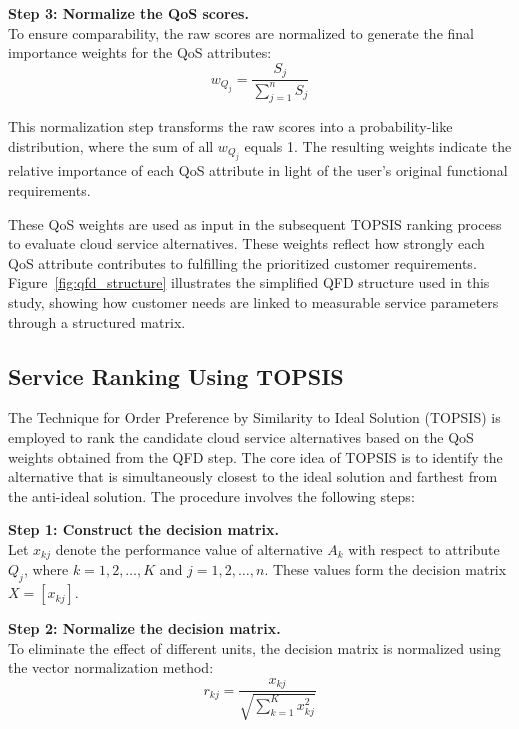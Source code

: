 \documentclass[twocolumn]{svjour3}
\begin{document}
\textbf{Step 3: Normalize the QoS scores.} \\
To ensure comparability, the raw scores are normalized to generate the final importance weights for the QoS attributes:
\begin{equation}
w_{Q_j} = \frac{S_j}{\sum_{j=1}^{n} S_j}
\label{eq:qos_weight}
\end{equation}


This normalization step transforms the raw scores into a probability-like distribution, where the sum of all $w_{Q_j}$ equals 1. The resulting weights indicate the relative importance of each QoS attribute in light of the user's original functional requirements.

These QoS weights are used as input in the subsequent TOPSIS ranking process to evaluate cloud service alternatives.
These weights reflect how strongly each QoS attribute contributes to fulfilling the prioritized customer requirements. Figure~\ref{fig:qfd_structure} illustrates the simplified QFD structure used in this study, showing how customer needs are linked to measurable service parameters through a structured matrix.





\subsection{Service Ranking Using TOPSIS}

The Technique for Order Preference by Similarity to Ideal Solution (TOPSIS) is employed to rank the candidate cloud service alternatives based on the QoS weights obtained from the QFD step. The core idea of TOPSIS is to identify the alternative that is simultaneously closest to the ideal solution and farthest from the anti-ideal solution. The procedure involves the following steps:

\textbf{Step 1: Construct the decision matrix.} \\
Let $x_{kj}$ denote the performance value of alternative $A_k$ with respect to attribute $Q_j$, where $k = 1,2,\dots,K$ and $j = 1,2,\dots,n$. These values form the decision matrix $X = [x_{kj}]$.

\textbf{Step 2: Normalize the decision matrix.} \\
To eliminate the effect of different units, the decision matrix is normalized using the vector normalization method:
\begin{equation}
r_{kj} = \frac{x_{kj}}{\sqrt{\sum_{k=1}^{K} x_{kj}^2}}
\label{eq:topsis_norm}
\end{equation}
\end{document}
